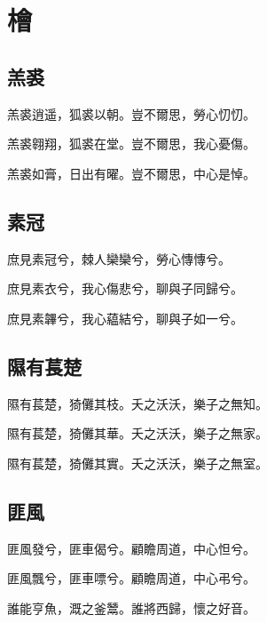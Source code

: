 \section[檜]{檜}

\subsection[羔裘]{羔裘}

羔裘逍遥，狐裘以朝。豈不爾思，勞心忉忉。

羔裘翱翔，狐裘在堂。豈不爾思，我心憂傷。

羔裘如膏，日出有曜。豈不爾思，中心是悼。

\subsection[素冠]{素冠}

庶見素冠兮，棘人欒欒兮，勞心慱慱兮。

庶見素衣兮，我心傷悲兮，聊與子同歸兮。

庶見素韠兮，我心藴結兮，聊與子如一兮。

\subsection[隰有萇楚]{隰有萇楚}

隰有萇楚，猗儺其枝。夭之沃沃，樂子之無知。

隰有萇楚，猗儺其華。夭之沃沃，樂子之無家。

隰有萇楚，猗儺其實。夭之沃沃，樂子之無室。

\subsection[匪風]{匪風}

匪風發兮，匪車偈兮。顧瞻周道，中心怛兮。

匪風飄兮，匪車嘌兮。顧瞻周道，中心弔兮。

誰能亨魚，溉之釜鬵。誰將西歸，懷之好音。
